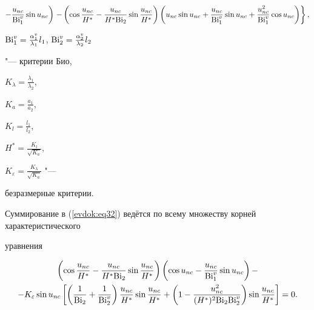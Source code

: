 \begin{multline}
\\

\label{evdok:eq33}

- \frac{u_{nc} }{{\rm Bi}_1^v }\sin 

u_{nc}  \bigg) 

\left. { - \left( {\cos \frac{u_{nc} }{H^\ast } - \frac{u_{nc} }{H^\ast {\rm Bi}_2 

}\sin \frac{u_{nc} }{H^\ast }} \right)\left( {u_{nc} \sin u_{nc} + 

\frac{u_{nc} }{{\rm Bi}_1^v }\sin u_{nc} + \frac{u_{nc}^2 }{{\rm Bi}_1^v }\cos u_{nc} 

} \right)} \right\} ,

\end{multline}

${\rm Bi}_1^v = \frac{\alpha _1^v }{\lambda _1 }l_1$, ${\rm Bi}_2^v = \frac{\alpha _2^v }{\lambda _2 }l_2$ 

"--- критерии Био,

$K_\lambda = \frac{\lambda _1 }{\lambda _2 }$,

$K_a = \frac{a_1 }{a_2 }$,

$K_l = \frac{l_1 }{l_2 }$, 

$H^\ast = \frac{K_l }{\sqrt {K_a }}$,

$K_\varepsilon = \frac{K_\lambda }{\sqrt {K_a } }$ "--- 

безразмерные критерии.



Суммирование в (\ref{evdok:eq32}) ведётся по всему множеству корней характеристического 

уравнения 

\begin{multline}

\label{evdok:eq34}

\left( {\cos \frac{u_{nc} }{H^\ast } - \frac{u_{nc} 

}{H^\ast {\rm Bi}_2 }\sin \frac{u_{nc} }{H^\ast }} \right)\left( {\cos u_{nc} - 

\frac{u_{nc} }{{\rm Bi}_1^v }\sin u_{nc} } \right) - \\ 

 - K_\varepsilon \sin u_{nc} \left[ {\left( {\frac{1}{{\rm Bi}_2 } + 

\frac{1}{{\rm Bi}_2^v }} \right)\frac{u_{nc} }{H^\ast }\sin \frac{u_{nc} }{H^\ast 

} + \left( {1 - \frac{u_{nc}^2 }{(H^\ast )^2{\rm Bi}_2 {\rm Bi}_2^v }} \right)\sin 

\frac{u_{nc} }{H^\ast }} \right] = 0.

\end{multline}



